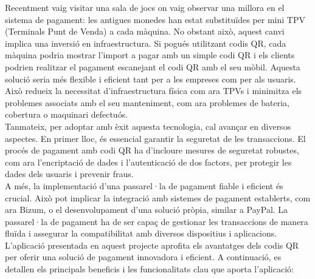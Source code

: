 \documentclass[a4paper,12pt,twoside]{ThesisStyle}
\begin{document}
Recentment vaig visitar una sala de jocs on vaig observar una millora en el sistema de pagament: les antigues monedes han estat substituïdes per mini TPV (Terminals Punt de Venda) a cada màquina. No obstant això, aquest canvi implica una inversió en infraestructura. Si pogués utilitzant codis QR, cada màquina podria mostrar l'import a pagar amb un simple codi QR i els clients podrien realitzar el pagament escanejant el codi QR amb el seu mòbil. Aquesta solució seria més flexible i eficient tant per a les empreses com per als usuaris. Això redueix la necessitat d'infraestructura física com ara TPVs i minimitza els problemes associats amb el seu manteniment, com ara problemes de bateria, cobertura o maquinari defectuós.\\

Tanmateix, per adoptar amb èxit aquesta tecnologia, cal avançar en diversos aspectes. En primer lloc, és essencial garantir la seguretat de les transaccions. El procés de pagament amb codi QR ha d'incloure mesures de seguretat robustes, com ara l'encriptació de dades i l'autenticació de dos factors, per protegir les dades dels usuaris i prevenir fraus.\\

A més, la implementació d'una passarel·la de pagament fiable i eficient és crucial. Això pot implicar la integració amb sistemes de pagament establerts, com ara Bizum, o el desenvolupament d'una solució pròpia, similar a PayPal. La passarel·la de pagament ha de ser capaç de gestionar les transaccions de manera fluïda i assegurar la compatibilitat amb diversos dispositius i aplicacions.\\


L'aplicació presentada en aquest projecte aprofita els avantatges dels codis QR per oferir una solució de pagament innovadora i eficient. A continuació, es detallen els principals beneficis i les funcionalitats clau que aporta l'aplicació:
\end{document}
